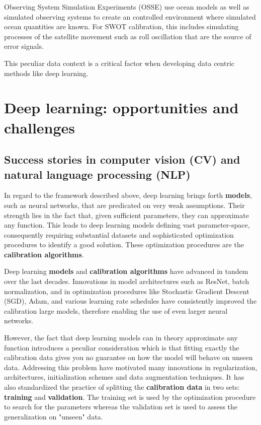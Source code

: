 \begin{bibunit}
Observing System Simulation Experiments (OSSE)\cite{verrierAssessingImpactMultiple2017} use ocean models as well as simulated observing systems to create an controlled environment where simulated ocean quantities are known. For SWOT calibration, this includes simulating processes of the satellite movement such as roll oscillation that are the source of error signals\cite{EmpiricalCrossCalibrationCoherent}.

This peculiar data context is a critical factor when developing data centric methods like deep learning.

% 

\section{Deep learning: opportunities and challenges}

\subsection{Success stories in computer vision (CV) and natural language processing (NLP)}

In regard to the framework described above, deep learning brings forth \textbf{models}, such as neural networks, that are predicated on very weak assumptions. Their strength lies in the fact that, given sufficient parameters, they can approximate any function\cite{hornikMultilayerFeedforwardNetworks1989}. This leads to deep learning models defining vast parameter-space, consequently requiring substantial datasets and sophisticated optimization procedures to identify a good solution. These optimization procedures are the \textbf{calibration algorithms}.

Deep learning \textbf{models} and \textbf{calibration algorithms} have advanced in tandem over the last decades.
Innovations in model architectures such as ResNet\cite{heDeepResidualLearning2016}, batch normalization\cite{ioffeBatchNormalizationAccelerating2015}, and in optimization procedures like Stochastic Gradient Descent (SGD)\cite{summaLargeScaleMachineLearning2011}, Adam\cite{kingmaAdamMethodStochastic2017}, and various learning rate schedules have consistently improved the calibration large models, therefore enabling the use of even larger neural networks. 

However, the fact that deep learning models can in theory approximate any function introduces a peculiar consideration which is that fitting exactly the calibration data gives you no guarantee on how the model will behave on unseen data.
Addressing this problem have motivated many innovations in regularization, architectures, initialization schemes and data augmentation techniques.
It has also standardized the practice of splitting the \textbf{calibration data} in two sets: \textbf{training} and \textbf{validation}.
The training set is used by the optimization procedure to search for the parameters whereas the validation set is used to assess the generalization on "unseen" data.


\end{bibunit}
